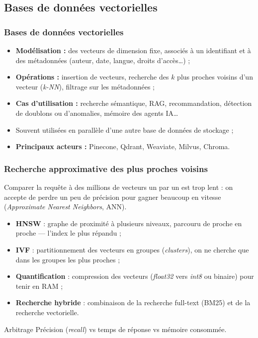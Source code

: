     \subsection{Bases de données vectorielles}
    \begin{frame}
        \frametitle{Bases de données vectorielles}

        \begin{itemize}
            \item \textbf{Modélisation :} des vecteurs de dimension fixe, associés à un identifiant et à des métadonnées (auteur, date, langue, droits d'accès\dots) ;
            \item \textbf{Opérations :} insertion de vecteurs, recherche des $k$ plus proches voisins d'un vecteur (\textit{k-NN}), filtrage sur les métadonnées ;
            \item \textbf{Cas d'utilisation :} recherche sémantique, RAG, recommandation, détection de doublons ou d'anomalies, mémoire des agents IA\dots
            \item Souvent utilisées en parallèle d'une autre base de données de stockage ;
            \item \textbf{Principaux acteurs :} Pinecone, Qdrant, Weaviate, Milvus, Chroma.
        \end{itemize}
    \end{frame}

    \begin{frame}
        \frametitle{Recherche approximative des plus proches voisins}

        \small
        Comparer la requête à des millions de vecteurs un par un est trop lent : on accepte de perdre un peu de précision pour gagner beaucoup en vitesse (\textit{Approximate Nearest Neighbors}, ANN).

        \begin{itemize}
            \small
            \item \textbf{HNSW} : graphe de proximité à plusieurs niveaux, parcouru de proche en proche — l'index le plus répandu ;
            \item \textbf{IVF} : partitionnement des vecteurs en groupes (\textit{clusters}), on ne cherche que dans les groupes les plus proches ;
            \item \textbf{Quantification} : compression des vecteurs (\textit{float32} vers \textit{int8} ou binaire) pour tenir en RAM ;
            \item \textbf{Recherche hybride} : combinaison de la recherche full-text (BM25) et de la recherche vectorielle.
        \end{itemize}

        \begin{alertblock}{Arbitrage}
            Précision (\textit{recall}) vs temps de réponse vs mémoire consommée.
        \end{alertblock}
    \end{frame}

